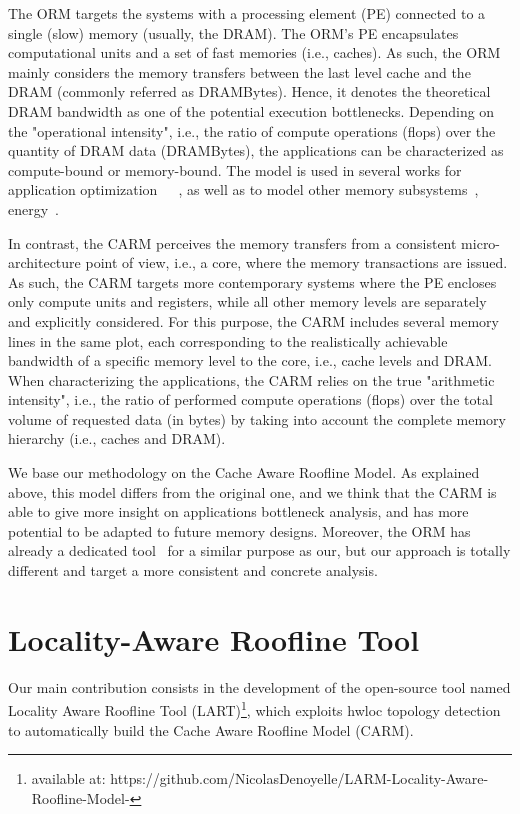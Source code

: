 \documentclass[twoside,twocolumn,8pt]{extarticle}
\begin{document}
The ORM targets the systems with a processing element (PE) connected to a single (slow) memory (usually, the DRAM). The ORM's
PE encapsulates computational units and a set of fast memories (i.e., caches). As such, the ORM mainly considers the memory
transfers between the last level cache and the DRAM (commonly referred as DRAMBytes). Hence, it denotes the theoretical DRAM
bandwidth as one of the potential execution bottlenecks. Depending on the "operational intensity", i.e., the ratio of compute
operations (flops) over the quantity of DRAM data (DRAMBytes), the applications can be characterized as compute-bound or
memory-bound. The model is used in several works for application
optimization~\cite{Kim20111201}~\cite{Rossinelli2164}~\cite{vanNieuwpoort:2009:UMH:1542275.1542337}, as well as to model other
memory subsystems~\cite{manyTaskRuntimeRooflneModel}, energy~\cite{7493653}. 

In contrast, the CARM perceives the memory transfers from a consistent micro-architecture point of view, i.e., a core, where
the memory transactions are issued. As such, the CARM targets more contemporary systems where the PE encloses only compute units
and registers, while all other memory levels are separately and explicitly considered. For this purpose, the CARM includes several
memory lines in the same plot, each corresponding to the realistically achievable bandwidth of a specific memory level to the core,
i.e., cache levels and DRAM. When characterizing the applications, the CARM relies on the true "arithmetic intensity", i.e., the
ratio of performed compute operations (flops) over the total volume of requested data (in bytes) by taking into account the
complete memory hierarchy (i.e., caches and DRAM).

We base our methodology on the Cache Aware Roofline Model. 
As explained above, this model differs from the original one, and we think that the CARM is able to give more insight on
applications bottleneck analysis, and has more potential to be adapted to future memory designs. Moreover, the ORM has already a
dedicated tool~\cite{Lo2015} for a similar purpose as our, but our approach is totally different and target a more consistent and
concrete analysis.

\section{Locality-Aware Roofline Tool}\label{sec:contrib}

Our main contribution consists in the development of the open-source tool named Locality Aware Roofline Tool (LART)\footnote{available at: https://github.com/NicolasDenoyelle/LARM-Locality-Aware-Roofline-Model-}, which
exploits hwloc topology detection to automatically build the Cache Aware Roofline Model (CARM).
\end{document}
